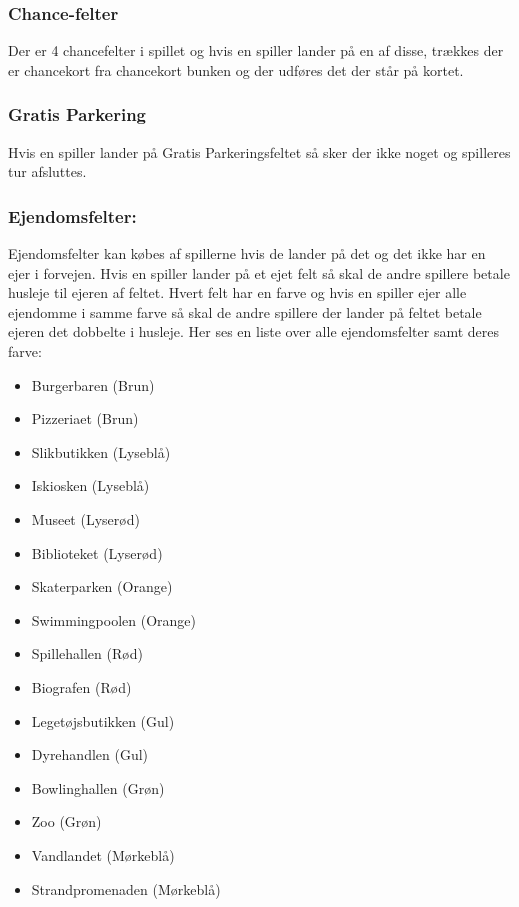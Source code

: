 \documentclass[../main.tex]{subfiles}
\begin{document}
\begin{flushleft}
\subsubsection*{Chance-felter}
Der er 4 chancefelter i spillet og hvis en spiller lander på en af disse, trækkes der er chancekort fra chancekort bunken og der udføres det der står på kortet.

\subsubsection*{Gratis Parkering}
Hvis en spiller lander på Gratis Parkeringsfeltet så sker der ikke noget og spilleres tur afsluttes.

\subsubsection*{Ejendomsfelter:}
Ejendomsfelter kan købes af spillerne hvis de lander på det og det ikke har en ejer i forvejen. Hvis en spiller lander på et ejet felt så skal de andre spillere betale husleje til ejeren af feltet. Hvert felt har en farve og hvis en spiller ejer alle ejendomme i samme farve så skal de andre spillere der lander på feltet betale ejeren det dobbelte i husleje. Her ses en liste over alle ejendomsfelter samt deres farve:
\begin{itemize}
    \item Burgerbaren (Brun)
    \item Pizzeriaet (Brun)
    \item Slikbutikken (Lyseblå)
    \item Iskiosken (Lyseblå)
    \item Museet (Lyserød)
    \item Biblioteket (Lyserød)
    \item Skaterparken (Orange)
    \item Swimmingpoolen (Orange)
    \item Spillehallen (Rød)
    \item Biografen (Rød)
    \item Legetøjsbutikken (Gul)
    \item Dyrehandlen  (Gul)
    \item Bowlinghallen (Grøn)
    \item Zoo (Grøn)
    \item Vandlandet (Mørkeblå)
    \item Strandpromenaden (Mørkeblå)
\end{itemize}


\end{flushleft}
\end{document}
